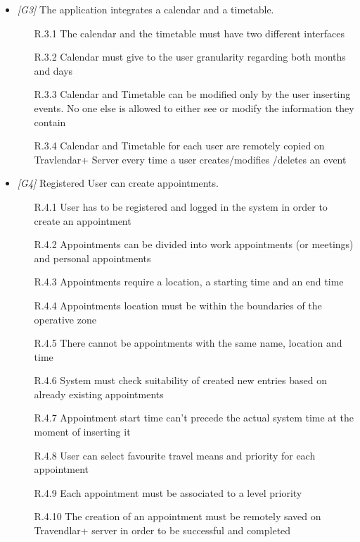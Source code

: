 \begin{itemize}
                  
\item \textit{[G3]} The application integrates a calendar and a timetable.

                  \begin{itemize}
                  
                  \item [R.3.1] The calendar and the timetable must have two different interfaces 
                  \item [R.3.2] Calendar must give to the user granularity regarding both months and days
                  \item [R.3.3] Calendar and Timetable can be modified only by the user inserting events. No one else is allowed to either see or modify the information they contain
                  \item [R.3.4] Calendar and Timetable for each user are remotely copied on Travlendar+ Server every time a user creates/modifies /deletes an event
                        
                  \end{itemize}
                  
\item \textit{[G4]} Registered User can create appointments.

 \begin{itemize}
                        \item [R.4.1] User has to be registered and logged in the system in order to create an
appointment
                        \item [R.4.2] Appointments can be divided into work appointments (or meetings) and personal appointments
                        \item [R.4.3] Appointments require a location, a starting time and an end time
                        \item [R.4.4] Appointments location must be within the boundaries of the operative zone
                        \item [R.4.5] There cannot be appointments with the same name, location and time
                        \item [R.4.6] System must check suitability of created new entries based on already existing appointments
                        \item [R.4.7] Appointment start time can't precede the actual system time at the moment of inserting it                                 														\item [R.4.8] User can select favourite travel means and priority for each appointment
                        \item [R.4.9] Each appointment must be associated to a level priority
                        \item [R.4.10] The creation of an appointment must be remotely saved on Travendlar+ server in order to be successful and completed
                        

\end{itemize}
\end{itemize}
